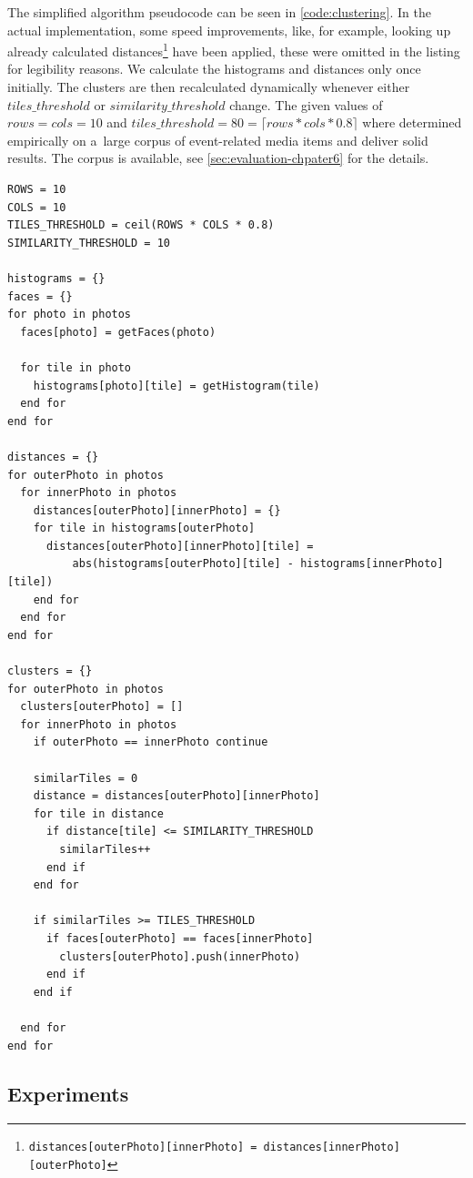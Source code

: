 The simplified algorithm pseudocode can be seen in \autoref{code:clustering}.
In the actual implementation, some speed improvements,
like, for example, looking up already calculated
distances\footnote{\texttt{distances[outerPhoto][innerPhoto] =
distances[innerPhoto][outerPhoto]}}
have been applied,
these were omitted in the listing for legibility reasons.
We calculate the histograms and distances only once initially.
The clusters are then recalculated dynamically
whenever either $tiles\_threshold$ or $similarity\_threshold$ change.
The given values of $rows = cols = 10$ and
$tiles\_threshold = 80 = \lceil rows * cols * 0.8 \rceil$ where determined empirically on a~large corpus of event-related media items
and deliver solid results.
The corpus is available, see \autoref{sec:evaluation-chpater6} for the details.


\begin{lstlisting}[caption={Simplified pseudocode of the near-duplicate
    photo clustering algorithm},
  label={code:clustering},escapechar=§]
ROWS = 10
COLS = 10
TILES_THRESHOLD = ceil(ROWS * COLS * 0.8)
SIMILARITY_THRESHOLD = 10

histograms = {}
faces = {}
for photo in photos
  faces[photo] = getFaces(photo)

  for tile in photo
    histograms[photo][tile] = getHistogram(tile)
  end for
end for  
    
distances = {}
for outerPhoto in photos
  for innerPhoto in photos
    distances[outerPhoto][innerPhoto] = {}
    for tile in histograms[outerPhoto]
      distances[outerPhoto][innerPhoto][tile] =
          abs(histograms[outerPhoto][tile] - histograms[innerPhoto][tile])
    end for
  end for
end for
  
clusters = {}
for outerPhoto in photos  
  clusters[outerPhoto] = []  
  for innerPhoto in photos
    if outerPhoto == innerPhoto continue
    
    similarTiles = 0
    distance = distances[outerPhoto][innerPhoto]
    for tile in distance      
      if distance[tile] <= SIMILARITY_THRESHOLD
        similarTiles++
      end if   
    end for
         
    if similarTiles >= TILES_THRESHOLD
      if faces[outerPhoto] == faces[innerPhoto]
        clusters[outerPhoto].push(innerPhoto)
      end if
    end if
    
  end for
end for        
\end{lstlisting}

\subsection{Experiments}

